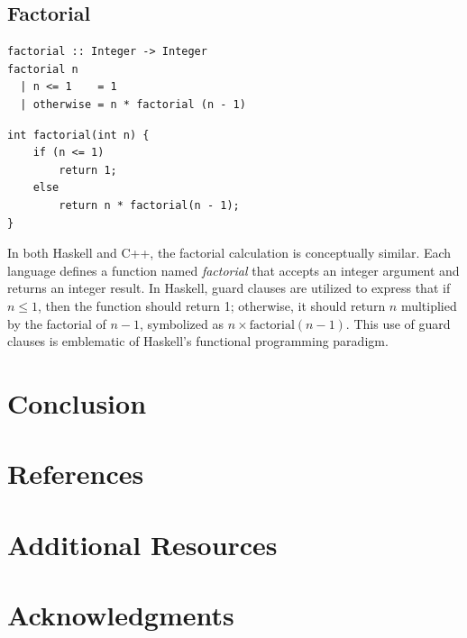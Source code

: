 \documentclass[a4paper, 10pt]{article}
\begin{document}
    \newpage
    \subsection{Factorial}

    \begin{minipage}[t]{0.45\textwidth}
        \lstset{language=Haskell}
        \begin{lstlisting}
factorial :: Integer -> Integer
factorial n
  | n <= 1    = 1
  | otherwise = n * factorial (n - 1)
        \end{lstlisting}
    \end{minipage}
    \hfill
    \begin{minipage}[t]{0.45\textwidth}
        \centering
        \vspace*{3mm}
        \lstset{language=C++}
        \begin{lstlisting}
int factorial(int n) {
    if (n <= 1)
        return 1;
    else
        return n * factorial(n - 1);
}
        \end{lstlisting}
    \end{minipage}

    \vspace*{3mm}
    \noindent In both Haskell and C++, the factorial calculation is conceptually similar. Each language defines a function named \textit{factorial} that accepts an integer argument and returns an integer result. In Haskell, guard clauses are utilized to express that if \( n \leq 1 \), then the function should return 1; otherwise, it should return \( n \) multiplied by the factorial of \( n - 1 \), symbolized as \( n \times \text{factorial}(n - 1) \). This use of guard clauses is emblematic of Haskell's functional programming paradigm.

	\section{Conclusion}
	\section{References}
	\section{Additional Resources}
	\section{Acknowledgments}
\end{document}
